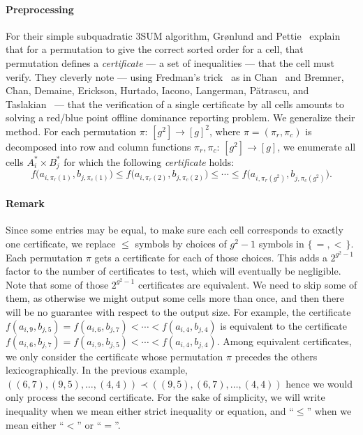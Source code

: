 \paragraph{Preprocessing}
For their simple subquadratic 3SUM algorithm, Gr\o nlund and Pettie~\cite{GP18}
explain that for a permutation to give the correct sorted order for a cell, that
permutation defines a \emph{certificate} --- a set of inequalities --- that
the cell must verify. They cleverly note --- using Fredman's trick~\cite{Fr76}
as in Chan~\cite{Cha08} and
%
Bremner,
Chan,
Demaine,
Erickson,
Hurtado,
Iacono,
Langerman,
P{\u a}tra{\cb s}cu,
and Taslakian~\cite{BCDEHILPT14}
--- that the verification of a single certificate by all cells amounts to
solving a red/blue point offline dominance reporting problem.
We generalize their method.
For each permutation $\pi\colon\,[g^2]\to{[g]}^2$, where $\pi =
(\pi_r,\pi_c)$ is decomposed into row and column functions
$\pi_r,\pi_c\colon\,[g^2]\to[g]$, we enumerate all cells $A_i^* \times B_j^*$
for which the following \emph{certificate} holds:
\begin{displaymath}
	f\Big(a_{i,\pi_r(1)},b_{j,\pi_c(1)}\Big)
	\le
	f\Big(a_{i,\pi_r(2)},b_{j,\pi_c(2)}\Big)
	\le
	\cdots
	\le
	f\Big(a_{i,\pi_r(g^2)},b_{j,\pi_c(g^2)}\Big).
\end{displaymath}

\paragraph{Remark}
Since some entries may be equal, to make sure each cell corresponds to exactly
one certificate, we replace $\le$ symbols by choices of $g^2-1$ symbols in
$\{\,=,<\,\}$. Each permutation $\pi$ gets a certificate for each of
those choices.
This adds a $2^{g^2-1}$ factor to the number of certificates
to test, which will eventually be negligible.
Note that some of those $2^{g^2-1}$ certificates are equivalent. We
need to skip some of them, as otherwise we might output some cells more than
once, and then there will be no guarantee with respect to the output size. For
example, the certificate $f(a_{i,9},b_{j,5}) = f(a_{i,6},b_{j,7}) < \cdots <
f(a_{i,4},b_{j,4})$ is equivalent to the certificate $f(a_{i,6},b_{j,7}) =
f(a_{i,9},b_{j,5}) < \cdots < f(a_{i,4},b_{j,4})$. Among equivalent
certificates, we only consider the certificate whose permutation $\pi$ precedes
the others lexicographically. In the previous example,
$((6,7),(9,5),\ldots,(4,4)) \prec ((9,5),(6,7),\ldots,(4,4))$ hence we would
only process the second certificate. For the sake of simplicity,
we will write inequality when we mean either strict inequality or equation, and
``$\le$'' when we mean either ``$<$'' or ``$=$''.

